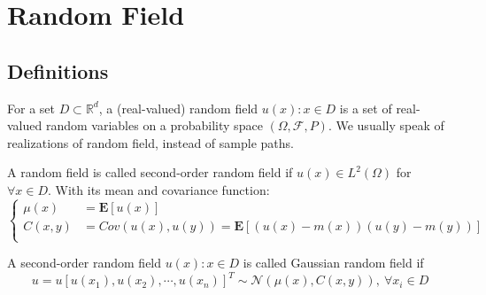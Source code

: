 \section{Random Field}
\subsection{Definitions}
\begin{definition}
    For a set $D\subset \mathbb{R}^d$, a (real-valued) random field ${u(x):x\in D}$ is a set of real-valued 
    random variables on a probability space $(\Omega, \mathcal{F}, P)$. We usually speak of realizations of random field, instead of sample paths. 
\end{definition}

\begin{definition}
    A random field is called second-order random field if $u(x)\in L^2(\Omega)$ for $\forall x\in D$. With its mean and covariance function:
    \begin{equation}\left\{
        \begin{aligned}
            \mu(x) &= \mathbf{E}[u(x)]\\
            C(x, y) &= Cov(u(x), u(y))=\mathbf{E}[(u(x)-m(x))(u(y)-m(y))]\\
        \end{aligned}\right.
    \end{equation}
\end{definition}

\begin{definition}
    A second-order random field ${u(x):x\in D}$ is called Gaussian random field if 
    \begin{equation}
        u = u[u(x_1), u(x_2), \cdots, u(x_n)]^T \sim \mathcal{N}(\mu(x), C(x, y)),\ \forall x_i \in D
    \end{equation}
\end{definition}

